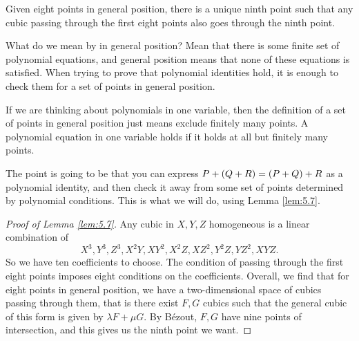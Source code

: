 \begin{lemma}
\label{lem:5.7}
Given eight points in general position, there is a unique ninth point such that any cubic passing through the first eight points also goes through the ninth point.
\end{lemma}

What do we mean by in general position? Mean that there is some finite set of polynomial equations, and general position means that none of these equations is satisfied. When trying to prove that polynomial identities hold, it is enough to check them for a set of points in general position.

\begin{example*}
If we are thinking about polynomials in one variable, then the definition of a set of points in general position just means exclude finitely many points. A polynomial equation in one variable holds if it holds at all but finitely many points.
\end{example*}

The point is going to be that you can express $ P + \left( Q + R \right) = \left( P + Q \right) + R $ as a polynomial identity, and then check it away from some set of points determined by polynomial conditions. This is what we will do, using Lemma \ref{lem:5.7}.

\begin{proof}[Proof of Lemma \ref{lem:5.7}]
Any cubic in $ X, Y, Z $ homogeneous is a linear combination of
$$ X^3, Y^3, Z^3, X^2Y, XY^2, X^2Z, XZ^2, Y^2Z, YZ^2, XYZ. $$
So we have ten coefficients to choose. The condition of passing through the first eight points imposes eight conditions on the coefficients. Overall, we find that for eight points in general position, we have a two-dimensional space of cubics passing through them, that is there exist $ F, G $ cubics such that the general cubic of this form is given by $ \lambda F + \mu G $. By Bézout, $ F, G $ have nine points of intersection, and this gives us the ninth point we want.
\end{proof}


\begin{center}
\end{center}

